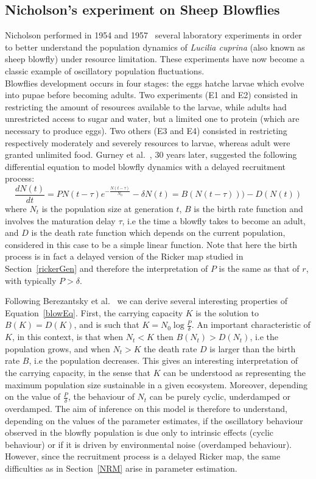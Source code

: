 \documentclass[12pt]{article}
\begin{document}
	\subsection{Nicholson's experiment on Sheep Blowflies} \label{Nicholson}
	Nicholson performed in 1954 and 1957~\cite{nicholson1954outline, nicholson1957self} several
	laboratory experiments in order to better understand the population dynamics of \emph{Lucilia cuprina} (also known as sheep blowfly)
	under resource limitation. These experiments have now become a classic example of oscillatory population fluctuations. \\
	Blowflies development occurs in four stages: the eggs hatche larvae which evolve into pupae before becoming adults. Two experiments  (E1 and E2) consisted in restricting the amount of resources available to the larvae, while adults had unrestricted access to sugar and water, but a limited one to protein (which are necessary to produce eggs). Two others (E3 and E4) consisted in restricting respectively moderately and severely resources to larvae, whereas adult were granted unlimited food. Gurney et al.~\cite{gurney1980nicholson}, 30 years later, suggested the following differential equation to model blowfly dynamics with a delayed recruitment process:
	\begin{equation} \label{blowEq}
		\frac{d N(t)}{d t} = PN(t-\tau)e^{-\frac{N(t-\tau)}{N_0}} -  \delta N(t) = B(N(t-\tau))) - D(N(t))
	\end{equation} 
	where $N_t$ is the population size at generation $t$, $B$ is the birth rate function and involves the maturation delay $\tau$, i.e the time a blowfly takes to become an adult, and $D$ is the death rate function which depends on the current population, considered in this case to be a simple linear function. Note that here the birth process is in fact a delayed version of the Ricker map studied in Section~\ref{rickerGen} and therefore the interpretation of $P$ is the same as that of $r$, with typically $P > \delta$.
	
	Following Berezantsky et al.~\cite{berezansky2010nicholson} we can derive several interesting properties of Equation~\ref{blowEq}. First, the carrying capacity $K$ is the solution to $B(K)=D(K)$, and is such that $K=N_0\log\frac{P}{\delta}$. An important characteristic of $K$, in this context, is that when $N_t < K$ then $B(N_t) > D(N_t)$, i.e the population grows, and when $N_t > K$ the death rate $D$ is larger than the birth rate $B$, i.e the population decreases. This gives an interesting interpretation of the carrying capacity, in the sense that $K$ can be understood as representing the maximum population size sustainable in a given ecosystem. Moreover, depending on the value of $\frac{P}{\delta}$, the behaviour of $N_t$ can be purely cyclic, underdamped or overdamped. The aim of inference on this model is therefore to understand, depending on the values of the parameter estimates, if the oscillatory behaviour observed in the blowfly population is due only to intrinsic effects (cyclic behaviour) or if it is driven by environmental noise (overdamped behaviour). However, since the recruitment process is a delayed Ricker map, the same difficulties  as in Section~\ref{NRM} arise in parameter estimation.
	
\end{document}
